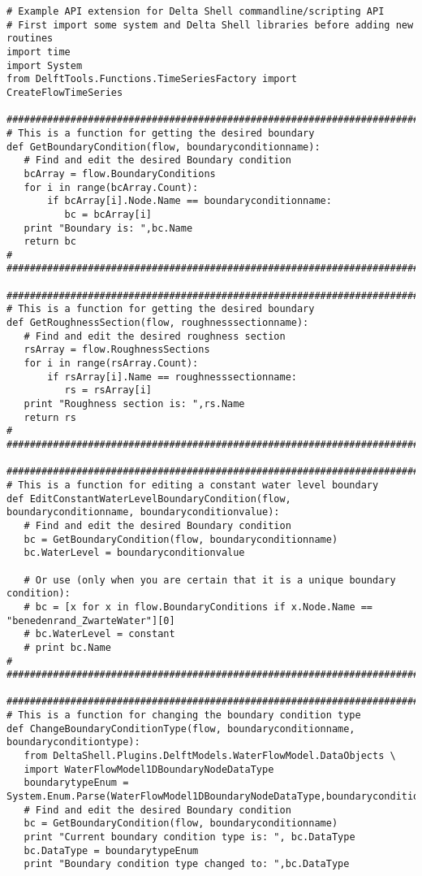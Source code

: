{\scriptsize 
\begin{verbatim}
# Example API extension for Delta Shell commandline/scripting API
# First import some system and Delta Shell libraries before adding new routines
import time
import System
from DelftTools.Functions.TimeSeriesFactory import CreateFlowTimeSeries

###################################################################################################
# This is a function for getting the desired boundary
def GetBoundaryCondition(flow, boundaryconditionname):
   # Find and edit the desired Boundary condition
   bcArray = flow.BoundaryConditions
   for i in range(bcArray.Count):
       if bcArray[i].Node.Name == boundaryconditionname:
          bc = bcArray[i]
   print "Boundary is: ",bc.Name
   return bc
#
###################################################################################################

###################################################################################################
# This is a function for getting the desired boundary
def GetRoughnessSection(flow, roughnesssectionname):
   # Find and edit the desired roughness section
   rsArray = flow.RoughnessSections
   for i in range(rsArray.Count):
       if rsArray[i].Name == roughnesssectionname:
          rs = rsArray[i]
   print "Roughness section is: ",rs.Name
   return rs
#
###################################################################################################

###################################################################################################
# This is a function for editing a constant water level boundary 
def EditConstantWaterLevelBoundaryCondition(flow, boundaryconditionname, boundaryconditionvalue):
   # Find and edit the desired Boundary condition
   bc = GetBoundaryCondition(flow, boundaryconditionname)
   bc.WaterLevel = boundaryconditionvalue
   
   # Or use (only when you are certain that it is a unique boundary condition):
   # bc = [x for x in flow.BoundaryConditions if x.Node.Name == "benedenrand_ZwarteWater"][0]
   # bc.WaterLevel = constant
   # print bc.Name
#
###################################################################################################

###################################################################################################
# This is a function for changing the boundary condition type
def ChangeBoundaryConditionType(flow, boundaryconditionname, boundaryconditiontype):
   from DeltaShell.Plugins.DelftModels.WaterFlowModel.DataObjects \
   import WaterFlowModel1DBoundaryNodeDataType
   boundarytypeEnum = System.Enum.Parse(WaterFlowModel1DBoundaryNodeDataType,boundaryconditiontype)
   # Find and edit the desired Boundary condition
   bc = GetBoundaryCondition(flow, boundaryconditionname)
   print "Current boundary condition type is: ", bc.DataType
   bc.DataType = boundarytypeEnum
   print "Boundary condition type changed to: ",bc.DataType


\end{verbatim}}
